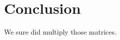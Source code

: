 \documentclass{article}  %
\begin{document}
% 


\section{Conclusion}

We sure did multiply those matrices.




% 
% 


\end{document}
